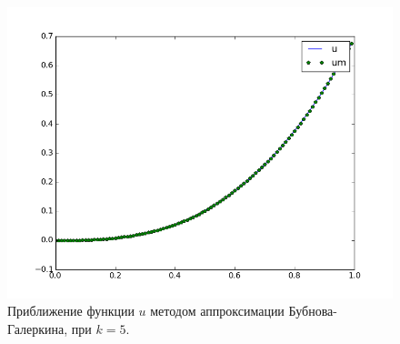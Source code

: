 \documentclass[12pt,a4paper,oneside]{extarticle}
\begin{document}
    \begin{figure}[ht!]
        \centering
        \includegraphics[scale=0.8]{k5.png}
        \caption{Приближение функции $u$ методом аппроксимации Бубнова-Галеркина, при $k = 5$.}
        \label{pic:k5}
    \end{figure}
\end{document}
